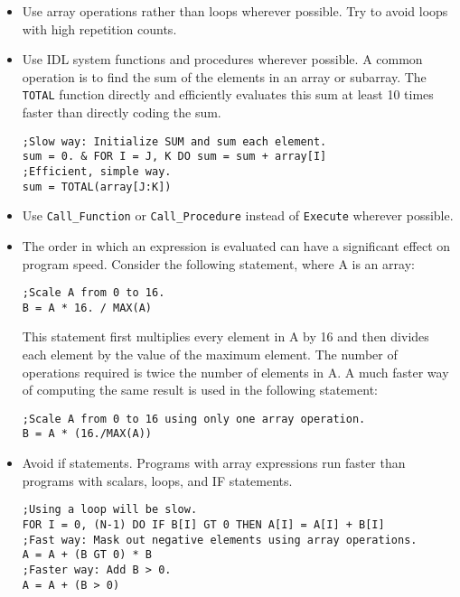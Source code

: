 \documentclass[12pt]{article}
\begin{document}
\begin{itemize}
\item Use array operations rather than loops wherever possible. Try to avoid loops with high repetition counts.
%
\item Use IDL system functions and procedures wherever possible. A common operation is to find the sum of the elements in an array or subarray. The \texttt{TOTAL} function directly and efficiently evaluates this sum at least 10 times faster than directly coding the sum.
\begin{verbatim}
;Slow way: Initialize SUM and sum each element. 
sum = 0. & FOR I = J, K DO sum = sum + array[I]
;Efficient, simple way.
sum = TOTAL(array[J:K])
\end{verbatim}
%
\item Use \texttt{Call\_Function} or \texttt{Call\_Procedure} instead of \texttt{Execute} wherever possible.
%
\item The order in which an expression is evaluated can have a significant effect on program speed. Consider the following statement, where A is an array:
\begin{verbatim}
;Scale A from 0 to 16.
B = A * 16. / MAX(A)
\end{verbatim}
This statement first multiplies every element in A by 16 and then divides each element by the value of the maximum element. The number of operations required is twice the number of elements in A. A much faster way of computing the same result is used in the following statement:
\begin{verbatim}
;Scale A from 0 to 16 using only one array operation.
B = A * (16./MAX(A))
\end{verbatim}
%
\item Avoid if statements. Programs with array expressions run faster than programs with scalars, loops, and IF statements. 
\begin{verbatim}
;Using a loop will be slow.
FOR I = 0, (N-1) DO IF B[I] GT 0 THEN A[I] = A[I] + B[I]
;Fast way: Mask out negative elements using array operations.
A = A + (B GT 0) * B
;Faster way: Add B > 0.
A = A + (B > 0)
\end{verbatim}


\end{itemize}
\end{document}
